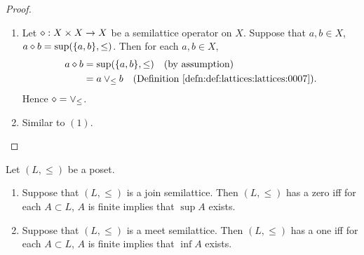 \documentclass{book}
\begin{document}
	\begin{proof}\
		\begin{enumerate}
			\item 
			Let $\diamond: X \times X \rightarrow X$ be a semilattice operator on $X$. Suppose that $a,b \in X$, $a \diamond b = \sup (\{a,b\}, \leq)$. Then for each $a,b \in X$,
			\begin{align*}
				a \dmd b
				& = \sup (\{a,b\}, \leq) \quad \text{(by assumption)} \\
				& = a \vee_{\leq} b \quad \text{(\rd{def:lattices:lattices:0007})}.
			\end{align*}
			Hence $\diamond = \vee_{\leq}$. 
			\item Similar to $(1)$.
		\end{enumerate}
	\end{proof}
	
	\begin{ex}
		Let $(L, \leq)$ be a poset. 
		\begin{enumerate}
			\item Suppose that $(L, \leq)$ is a join semilattice. Then $(L, \leq)$ has a zero iff for each $A \subset L$, $A$ is finite implies that $\sup A$ exists.  
			\item Suppose that $(L, \leq)$ is a meet semilattice. Then $(L, \leq)$ has a one iff for each $A \subset L$, $A$ is finite implies that $\inf A$ exists.  
		\end{enumerate}
	\end{ex}
	
\end{document}

